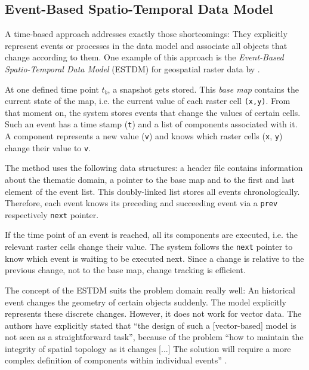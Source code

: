 \subsection{Event-Based Spatio-Temporal Data Model} %
\label{sub:event_based_spatio_temporal_data_model}

A time-based approach addresses exactly those shortcomings: They explicitly represent events or processes in the data model and associate all objects that change according to them. One example of this approach is the \emph{Event-Based Spatio-Temporal Data Model} (ESTDM) for geospatial raster data by
\cite{peuquet95}.

At one defined time point $t_b$, a snapshot gets stored. This \emph{base map} contains the current state of the map, i.e. the current value of each raster cell \texttt{(x,y)}. From that moment on, the system stores events that change the values of certain cells. Such an event has a time stamp (\texttt{t}) and a list of components associated with it. A component represents a new value (\texttt{v}) and knows which raster cells (\texttt{x}, \texttt{y}) change their value to \texttt{v}.

The method uses the following data structures: a header file contains information about the thematic domain, a pointer to the base map and to the first and last element of the event list. This doubly-linked list stores all events chronologically. Therefore, each event knows its preceding and succeeding event via a \texttt{prev} respectively \texttt{next} pointer.

If the time point of an event is reached, all its components are executed, i.e. the relevant raster cells change their value. The system follows the \texttt{next} pointer to know which event is waiting to be executed next. Since a change is relative to the previous change, not to the base map, change tracking is efficient.

The concept of the ESTDM suits the problem domain really well: An historical event changes the geometry of certain objects suddenly. The model explicitly represents these discrete changes. However, it does not work for vector data. The authors have explicitly stated that ``the design of such a [vector-based] model is not seen as a straightforward task'', because of the problem ``how to maintain the integrity of spatial topology as it changes [...] The solution will require a more complex definition of components within individual events''
\cite[p. 21]{peuquet95}.

